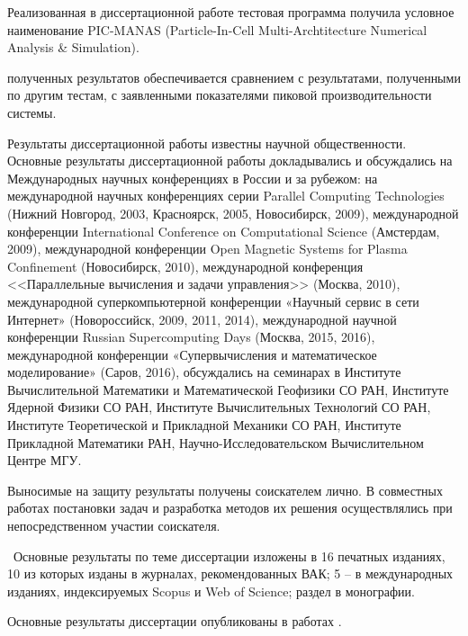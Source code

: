 Реализованная в диссертационной работе тестовая программа получила условное наименование 
PIC-MANAS (Particle-In-Cell Multi-Archtitecture Numerical Analysis \& Simulation).


{\reliability}  полученных результатов обеспечивается сравнением с результатами, полученными по другим тестам, с заявленными показателями пиковой производительности системы.


{\probation}

Результаты диссертационной работы известны научной общественности. 
Основные результаты диссертационной работы докладывались и обсуждались на Международных научных конференциях в России и за рубежом: на международной научных конференциях серии Parallel Computing Technologies (Нижний Новгород, 2003, Красноярск, 2005, Новосибирск, 2009), международной конференции International Conference on Computational Science (Амстердам, 2009),  международной конференции Open Magnetic Systems for Plasma Confinement (Новосибирск, 2010), международной конференция <<Параллельные вычисления и задачи управления>> (Москва, 2010), международной суперкомпьютерной конференции  «Научный сервис в сети Интернет» (Новороссийск, 2009, 2011, 2014), международной научной конференции Russian Supercomputing Days (Москва, 2015, 2016), международной конференции «Супервычисления и математическое моделирование» (Саров, 2016), обсуждались на семинарах в Институте Вычислительной Математики и Математической Геофизики СО РАН, Институте Ядерной Физики СО РАН, Институте Вычислительных Технологий СО РАН, Институте Теоретической и Прикладной Механики СО РАН, Институте Прикладной Математики РАН, Научно-Исследовательском Вычислительном Центре МГУ.



{\contribution} Выносимые на защиту результаты получены соискателем лично. В совместных работах постановки задач и разработка методов их решения осуществлялись при непосредственном участии соискателя.


 \publications\ Основные результаты по теме диссертации изложены в 16 печатных изданиях, 
 10 из которых изданы в журналах, рекомендованных ВАК; 5 – в
 международных изданиях, индексируемых Scopus и Web of Science; раздел в монографии.
 
 Основные результаты диссертации опубликованы в работах \cite{MohographyTarkov,VestnikNNSU,multigridAuto,AutoParSilan,VychMetPlasma,Adaptive,VestnikNSU3D,NumMethMultiLevel,MatMod,VestnikNSUadapt,VychMethProgExa,SuperFrI,adaptCPC,LotovPoP,astroCoDesign,integrApproach}.


